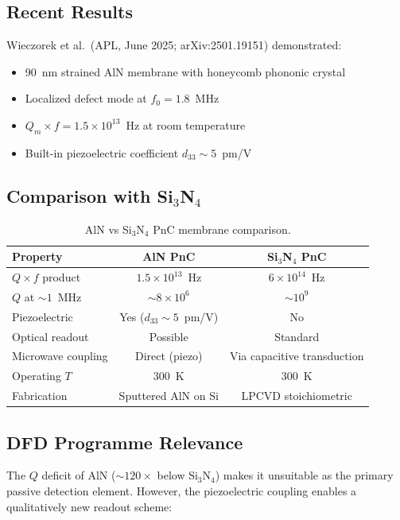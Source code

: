 \documentclass[11pt]{article}
\theoremstyle{definition}
\theoremstyle{remark}
\newcommand{\ee}[1]{\times 10^{#1}}
\begin{document}
\subsection{Recent Results}

Wieczorek et al.\ (APL, June 2025; arXiv:2501.19151) demonstrated:
\begin{itemize}[nosep]
\item 90~nm strained AlN membrane with honeycomb phononic crystal
\item Localized defect mode at $f_0 = 1.8$~MHz
\item $Q_m \times f = 1.5\ee{13}$~Hz at room temperature
\item Built-in piezoelectric coefficient $d_{33} \sim 5$~pm/V
\end{itemize}

\subsection{Comparison with Si$_3$N$_4$}

\begin{table}[H]
\centering
\caption{AlN vs Si$_3$N$_4$ PnC membrane comparison.}
\renewcommand{\arraystretch}{1.3}
\begin{tabular}{lcc}
\toprule
\textbf{Property} & \textbf{AlN PnC} & \textbf{Si$_3$N$_4$ PnC} \\
\midrule
$Q \times f$ product & $1.5\ee{13}$~Hz & $6\ee{14}$~Hz \\
$Q$ at $\sim 1$~MHz & $\sim 8\ee{6}$ & $\sim 10^9$ \\
Piezoelectric & Yes ($d_{33} \sim 5$~pm/V) & No \\
Optical readout & Possible & Standard \\
Microwave coupling & Direct (piezo) & Via capacitive transduction \\
Operating $T$ & 300~K & 300~K \\
Fabrication & Sputtered AlN on Si & LPCVD stoichiometric \\
\bottomrule
\end{tabular}
\end{table}

\subsection{DFD Programme Relevance}

The $Q$ deficit of AlN ($\sim 120\times$ below Si$_3$N$_4$) makes it
unsuitable as the primary passive detection element. However, the
piezoelectric coupling enables a qualitatively new readout scheme:
\end{document}
